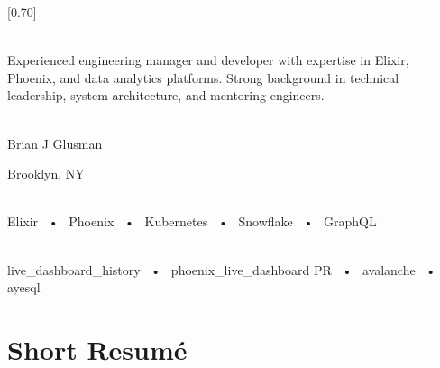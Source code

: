 \documentclass[lighthipster]{hipster-cv}
\begin{document}
\setlength{\columnsep}{0.03\textwidth}
[0.70]
\begin{paracol}{2}

\paracolbackgroundoptions



\footnotesize
{\setasidefontcolour
\flushright

\\[0.5em]

{\footnotesize
Experienced engineering manager and developer with expertise in Elixir, Phoenix, and data analytics platforms. Strong background in technical leadership, system architecture, and mentoring engineers.}
\bigskip

 \\[0.5em]
Brian J Glusman

Brooklyn, NY

\bigskip

 \\[0.5em]

Elixir ~•~ Phoenix ~•~ Kubernetes ~•~ Snowflake ~•~ GraphQL

\bigskip

\\[0.5em]

live\_dashboard\_history ~•~ phoenix\_live\_dashboard PR ~•~ avalanche ~•~ ayesql
\bigskip

\vspace{4em}


\phantom{turn the page}

\phantom{turn the page}
}
\switchcolumn

\small
\section*{Short Resumé}


\end{paracol}
\end{document}
